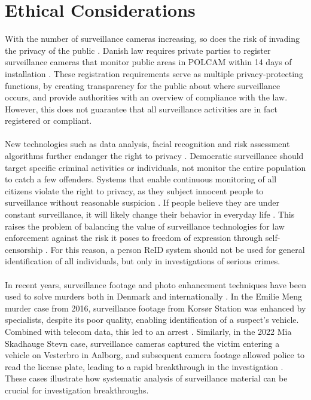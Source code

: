 \section{Ethical Considerations}
\label{sec:ethical_considerations}
With the number of surveillance cameras increasing, so does the risk of invading the privacy of the public \cite{overvagningsekspert2025}. Danish law requires private parties to register surveillance cameras that monitor public areas in \acs{POLCAM} within 14 days of installation \cite{lov_tv_overvaagning2023, politiet2024registrer}. These registration requirements serve as multiple privacy-protecting functions, by creating transparency for the public about where surveillance occurs, and provide authorities with an overview of compliance with the law. However, this does not guarantee that all surveillance activities are in fact registered or compliant.
\\\\
New technologies such as data analysis, facial recognition and risk assessment algorithms further endanger the right to privacy \cite{overvagningsekspert2025}. Democratic surveillance should target specific criminal activities or individuals, not monitor the entire population to catch a few offenders. Systems that enable continuous monitoring of all citizens violate the right to privacy, as they subject innocent people to surveillance without reasonable suspicion \cite{menneskeret_overvaagning,justitia_overvaagning}.
If people believe they are under constant surveillance, it will likely change their behavior in everyday life \cite{overvagningsekspert2025}. This raises the problem of balancing the value of surveillance technologies for law enforcement against the risk it poses to freedom of expression through self-censorship \cite{overvagningsekspert2025}. For this reason, a person \acs{ReID} system should not be used for general identification of all individuals, but only in investigations of serious crimes.
\\\\
In recent years, surveillance footage and photo enhancement techniques have been used to solve murders both in Denmark and internationally \cite{overvagningsekspert2025}. In the Emilie Meng murder case from 2016, surveillance footage from Korsør Station was enhanced by specialists, despite its poor quality, enabling identification of a suspect's vehicle. Combined with telecom data, this led to an arrest \cite{emilie_meng_avisen,emilie_meng_wiki}. Similarly, in the 2022 Mia Skadhauge Stevn case, surveillance cameras captured the victim entering a vehicle on Vesterbro in Aalborg, and subsequent camera footage allowed police to read the license plate, leading to a rapid breakthrough in the investigation \cite{emilie_meng_avisen}. These cases illustrate how systematic analysis of surveillance material can be crucial for investigation breakthroughs.

